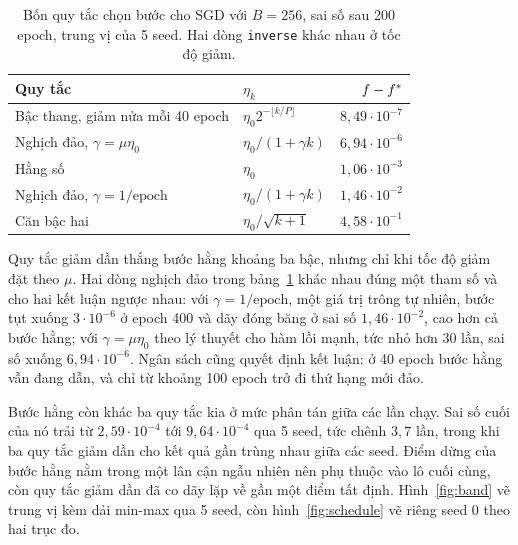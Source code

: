 \documentclass[12pt, a4paper, oneside]{report}
\theoremstyle{definition}
\begin{document}
\begin{table}[tbp]
  \centering
  \caption{Bốn quy tắc chọn bước cho SGD với $B = 256$, sai số sau 200 epoch,
    trung vị của 5 seed. Hai dòng \texttt{inverse} khác nhau ở tốc độ giảm.}
  \label{tab:schedule}
  \begin{tabular}{llr}
    \toprule
    Quy tắc & $\eta_k$ & $f - f^{*}$ \\
    \midrule
    Bậc thang, giảm nửa mỗi 40 epoch & $\eta_{0} 2^{-\lfloor k/P \rfloor}$ & $8{,}49 \cdot 10^{-7}$ \\
    Nghịch đảo, $\gamma = \mu \eta_{0}$      & $\eta_{0}/(1+\gamma k)$ & $6{,}94 \cdot 10^{-6}$ \\
    Hằng số                                   & $\eta_{0}$              & $1{,}06 \cdot 10^{-3}$ \\
    Nghịch đảo, $\gamma = 1/\text{epoch}$     & $\eta_{0}/(1+\gamma k)$ & $1{,}46 \cdot 10^{-2}$ \\
    Căn bậc hai                               & $\eta_{0}/\sqrt{k+1}$   & $4{,}58 \cdot 10^{-1}$ \\
    \bottomrule
  \end{tabular}
\end{table}

Quy tắc giảm dần thắng bước hằng khoảng ba bậc, nhưng chỉ khi tốc độ giảm đặt
theo $\mu$. Hai dòng nghịch đảo trong bảng~\ref{tab:schedule} khác nhau đúng một
tham số và cho hai kết luận ngược nhau: với $\gamma = 1/\text{epoch}$, một giá trị
trông tự nhiên, bước tụt xuống $3 \cdot 10^{-6}$ ở epoch 400 và dãy đóng băng ở
sai số $1{,}46 \cdot 10^{-2}$, cao hơn cả bước hằng; với $\gamma = \mu \eta_{0}$
theo lý thuyết cho hàm lồi mạnh, tức nhỏ hơn 30 lần, sai số xuống
$6{,}94 \cdot 10^{-6}$. Ngân sách cũng quyết định kết luận: ở 40 epoch bước hằng
vẫn đang dẫn, và chỉ từ khoảng 100 epoch trở đi thứ hạng mới đảo.

Bước hằng còn khác ba quy tắc kia ở mức phân tán giữa các lần chạy. Sai số cuối
của nó trải từ $2{,}59 \cdot 10^{-4}$ tới $9{,}64 \cdot 10^{-4}$ qua 5 seed, tức
chênh $3{,}7$ lần, trong khi ba quy tắc giảm dần cho kết quả gần trùng nhau giữa
các seed. Điểm dừng của bước hằng nằm trong một lân cận ngẫu nhiên nên phụ thuộc
vào lô cuối cùng, còn quy tắc giảm dần đã co dãy lặp về gần một điểm tất định.
Hình~\ref{fig:band} vẽ trung vị kèm dải min-max qua 5 seed, còn
hình~\ref{fig:schedule} vẽ riêng seed 0 theo hai trục đo.

\end{document}
